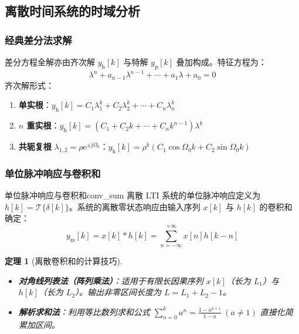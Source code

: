 \documentclass[11pt,a4paper,fontset=fandol]{ctexart}
\newtheorem{theorem}{定理}[section]
\theoremstyle{remark}
\begin{document}
\subsection{离散时间系统的时域分析}

\subsubsection{经典差分法求解}
差分方程全解亦由齐次解 $y_{\mathrm{h}}[k]$ 与特解 $y_{\mathrm{p}}[k]$ 叠加构成。特征方程为：
\begin{equation}
    \lambda^n + a_{n-1}\lambda^{n-1} + \cdots + a_1 \lambda + a_0 = 0
\end{equation}
齐次解形式：
\begin{enumerate}
    \item \textbf{单实根}：$y_{\mathrm{h}}[k] = C_1 \lambda_1^k + C_2 \lambda_2^k + \cdots + C_n \lambda_n^k$
    \item \textbf{$n$ 重实根}：$y_{\mathrm{h}}[k] = (C_1 + C_2 k + \cdots + C_n k^{n-1})\lambda^k$
    \item \textbf{共轭复根} $\lambda_{1,2} = \rho \mathrm{e}^{\pm \mathrm{j}\Omega_0}$：$y_{\mathrm{h}}[k] = \rho^k (C_1 \cos\Omega_0 k + C_2 \sin\Omega_0 k)$
\end{enumerate}

\subsubsection{单位脉冲响应与卷积和}
\begin{definition}{单位脉冲响应与卷积和}{conv_sum}
离散 LTI 系统的单位脉冲响应定义为 $h[k] = \mathcal{T}\{\delta[k]\}$。系统的离散零状态响应由输入序列 $x[k]$ 与 $h[k]$ 的卷积和确定：
\begin{equation}
    y_{\mathrm{zs}}[k] = x[k] * h[k] = \sum_{n=-\infty}^{+\infty} x[n]h[k - n]
\end{equation}
\end{definition}

\begin{theorem}[离散卷积和的计算技巧]
\begin{itemize}
    \item \textbf{对角线列表法（阵列乘法）}：适用于有限长因果序列 $x[k]$（长为 $L_1$）与 $h[k]$（长为 $L_2$）。输出非零区间长度为 $L = L_1 + L_2 - 1$。
    \item \textbf{解析求和法}：利用等比数列求和公式 $\sum_{n=0}^{k} a^n = \frac{1 - a^{k+1}}{1 - a} \ (a \neq 1)$ 直接化简累加区间。
\end{itemize}
\end{theorem}
\end{document}

